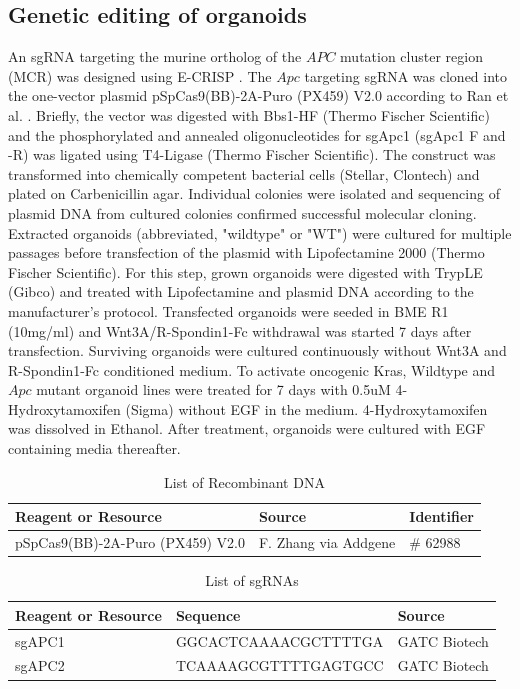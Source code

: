 \begin{flushleft}
\subsection{Genetic editing of organoids}
An sgRNA targeting the murine ortholog of the $APC$ mutation cluster region (MCR) was designed using E-CRISP \citep{heigwerECRISPFastCRISPR2014}. The $Apc$ targeting sgRNA was cloned into the one-vector plasmid pSpCas9(BB)-2A-Puro (PX459) V2.0 according to Ran et al. \citep{ranGenomeEngineeringUsing2013}. Briefly, the vector was digested with Bbs1-HF (Thermo Fischer Scientific) and the phosphorylated and annealed oligonucleotides for sgApc1 (sgApc1 F and -R) was ligated using T4-Ligase (Thermo Fischer Scientific). The construct was transformed into chemically competent bacterial cells (Stellar, Clontech) and plated on Carbenicillin agar. Individual colonies were isolated and sequencing of plasmid DNA from cultured colonies confirmed successful molecular cloning.   
Extracted organoids (abbreviated, "wildtype" or "WT") were cultured for multiple passages before transfection of the plasmid with Lipofectamine 2000 (Thermo Fischer Scientific). For this step, grown organoids were digested with TrypLE (Gibco) and treated with Lipofectamine and plasmid DNA according to the manufacturer’s protocol. Transfected organoids were seeded in BME R1 (10mg/ml) and Wnt3A/R-Spondin1-Fc withdrawal was started 7 days after transfection. Surviving organoids were cultured continuously without Wnt3A and R-Spondin1-Fc conditioned medium.
To activate oncogenic Kras, Wildtype and $Apc$ mutant organoid lines were treated for 7 days with 0.5uM 4-Hydroxytamoxifen (Sigma) without EGF in the medium. 4-Hydroxytamoxifen was dissolved in Ethanol. After treatment, organoids were cultured with EGF containing media thereafter.

\begin{table}[htb]
\caption{List of Recombinant DNA}
\label{tab:recombinant_dna} %
\begin{tabularx}{\textwidth}{Xll}
\toprule
\textbf{Reagent or Resource} & \textbf{Source} & \textbf{Identifier} \\
\midrule
pSpCas9(BB)-2A-Puro (PX459) V2.0 & F. Zhang via Addgene & \# 62988 \\
\bottomrule
\end{tabularx}
\end{table}

\begin{table}[htb]
\caption{List of sgRNAs}
\label{tab:oligonucleotides} %
\begin{tabularx}{\textwidth}{XlX}
\toprule
\textbf{Reagent or Resource} & \textbf{Sequence} & \textbf{Source} \\
\midrule
sgAPC1 & GGCACTCAAAACGCTTTTGA & GATC Biotech \\
sgAPC2 & TCAAAAGCGTTTTGAGTGCC & GATC Biotech \\
\bottomrule
\end{tabularx}
\end{table}


\end{flushleft}
